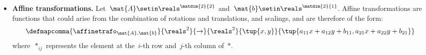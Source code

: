 {\begin{solution}
\begin{itemize}
\begin{equation}
\begin{aligned}
                       & y\cos(\theta+\phi)-x\sin(\theta+\phi)+t\cos(\phi)-s\sin(\phi)+v\rangle \\
                       & =\rototrans_{\theta+\phi,s\cos(\phi)+t\sin(\phi)+u, t\cos(\phi)-s\sin(\phi)+v}(x,y).
                  \end{aligned}
              \end{equation}
              Finally, the  in \Draw corresponds to a rotation of the form $\rototrans_{0,0,0}$.
        \item \textbf{Affine transformations.}
              Let~$\mat{A}\setin \reals^{\matdim{2}{2}}$ and~$\mat{b}\setin \reals^{\matdim{2}{1}}$.
              Affine transformations are functions that could arise from the combination of rotations and translations, and scalings, and are therefore of the form:
              \begin{equation}
                  \defmapcomma{
                  \affinetrafo_{\mat{A},\mat{b}}
                  }{
                  \reals^2
                  }{
                  \to
                  }{
                  \reals^2
                  }{
                  \tup{x,y}
                  }{
                  \tup{a_{11}x+a_{12}y+b_{11},a_{21}x+a_{22}y+b_{21}}
                  }
              \end{equation}
              where~$*_{ij}$ represents the element at the~$i$-th row and~$j$-th column of~$*$.


\end{itemize}
\end{solution}}
